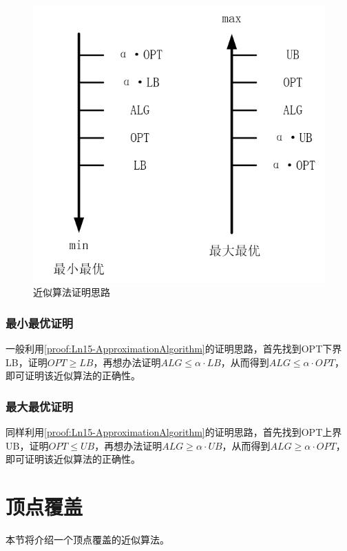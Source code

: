 \begin{figure}[htb]
	\centering
	\includegraphics[scale=0.3]{image/Ln15-ApproximationAlgorithm1.png}
	\caption{近似算法证明思路}\label{proof:Ln15-ApproximationAlgorithm}
\end{figure}

\subsubsection{最小最优证明}
一般利用\autoref{proof:Ln15-ApproximationAlgorithm}的证明思路，首先找到OPT下界LB，证明$OPT\geqslant LB$，再想办法证明$ALG\leqslant \alpha \cdot LB$，从而得到$ALG\leqslant \alpha \cdot OPT$，即可证明该近似算法的正确性。
\subsubsection{最大最优证明}
同样利用\autoref{proof:Ln15-ApproximationAlgorithm}的证明思路，首先找到OPT上界UB，证明$OPT\leqslant UB$，再想办法证明$ALG\geqslant \alpha \cdot UB$，从而得到$ALG\geqslant \alpha \cdot OPT$，即可证明该近似算法的正确性。



\section{顶点覆盖}

本节将介绍一个顶点覆盖的近似算法。

